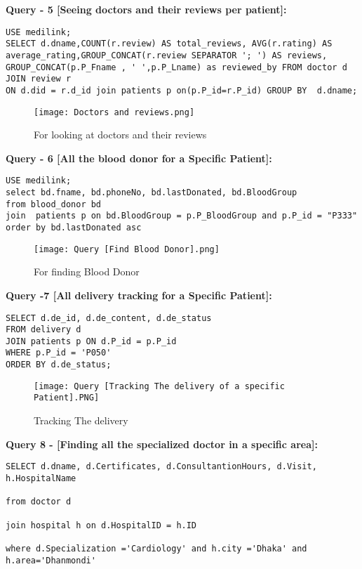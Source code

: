 \documentclass[11pt]{article}
\begin{document}
\textbf{Query - 5 [Seeing doctors and their reviews per patient]:}


\begin{lstlisting}
USE medilink; 
SELECT d.dname,COUNT(r.review) AS total_reviews, AVG(r.rating) AS  average_rating,GROUP_CONCAT(r.review SEPARATOR '; ') AS reviews,
GROUP_CONCAT(p.P_Fname , ' ',p.P_Lname) as reviewed_by FROM doctor d JOIN review r 
ON d.did = r.d_id join patients p on(p.P_id=r.P_id) GROUP BY  d.dname;
\end{lstlisting}

\begin{figure}[H]
    \centering
    \texttt{[image: Doctors and reviews.png]}
    \caption{For looking at doctors and their reviews}
    \label{fig:1}
\end{figure}



\textbf{Query - 6 [All the blood donor for a Specific Patient]:}
\begin{lstlisting}
USE medilink; 
select bd.fname, bd.phoneNo, bd.lastDonated, bd.BloodGroup
from blood_donor bd 
join  patients p on bd.BloodGroup = p.P_BloodGroup and p.P_id = "P333"
order by bd.lastDonated asc 
\end{lstlisting}

\begin{figure}[H]
    \centering
    \texttt{[image: Query [Find Blood Donor].png]}
    \caption{For finding Blood Donor}
    \label{fig:1}
\end{figure}


\textbf{Query -7 [All delivery tracking for a Specific Patient]:}
\begin{lstlisting}
SELECT d.de_id, d.de_content, d.de_status
FROM delivery d
JOIN patients p ON d.P_id = p.P_id
WHERE p.P_id = 'P050'
ORDER BY d.de_status;
\end{lstlisting}

\begin{figure}[H]
    \centering
    \texttt{[image: Query [Tracking The delivery of a specific Patient].PNG]}
    \caption{Tracking The delivery}
    \label{fig:1}
\end{figure}



\textbf{Query 8 - [Finding all the specialized doctor in a specific area]:}
\begin{lstlisting}
SELECT d.dname, d.Certificates, d.ConsultantionHours, d.Visit, h.HospitalName 

from doctor d

join hospital h on d.HospitalID = h.ID 

where d.Specialization ='Cardiology' and h.city ='Dhaka' and h.area='Dhanmondi'
\end{lstlisting}
\end{document}
